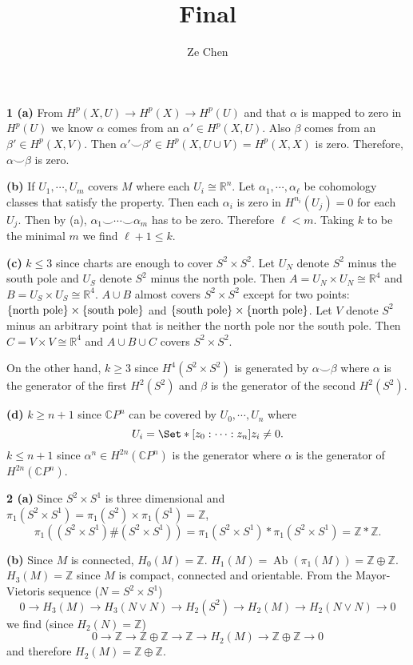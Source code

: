 \documentclass{article}
\title{Final}
\author{Ze Chen}
\makeatletter
\newcommand*{\shifttext}[1]{%
  \settowidth{\@tempdima}{#1}%
  \hspace{-\@tempdima}#1%
}
\newcommand{\plabel}[1]{%
\shifttext{\textbf{#1}\quad}%
}
\newcommand{\prule}{%
\begin{center}%
\hdashrule[0.5ex]{.99\linewidth}{1pt}{1pt 2.5pt}%
\end{center}%
}
\makeatother
\begin{document}
\maketitle

\plabel{1 (a)}%
From $H^p(X,U) \rightarrow H^p(X) \rightarrow H^p(U)$ and that $\alpha$ is mapped to zero in $H^p(U)$ we know $\alpha$ comes from an $\alpha'\in H^p(X,U)$.
Also $\beta$ comes from an $\beta'\in H^p(X,V)$.
Then $\alpha'\smile \beta'\in H^p(X,U\cup V) = H^p(X,X)$ is zero.
Therefore, $\alpha\smile \beta$ is zero.

\plabel{(b)}%
If $U_1,\cdots,U_m$ covers $M$ where each $U_i \cong \mathbb{R}^n$.
Let $\alpha_1,\cdots,\alpha_\ell$ be cohomology classes that satisfy the property.
Then each $\alpha_i$ is zero in $H^{n_i}(U_j)=0$ for each $U_j$.
Then by (a), $\alpha_1 \smile \cdots \smile \alpha_m$ has to be zero.
Therefore $\ell < m$. Taking $k$ to be the minimal $m$ we find $\ell+1\le k$.

\plabel{(c)}%
$k\le 3$ since charts are enough to cover $S^2\times S^2$.
Let $U_N$ denote $S^2$ minus the south pole and $U_S$ denote $S^2$ minus the north pole.
Then $A = U_N \times U_N \cong \mathbb{R}^4$ and $B = U_S\times U_S \cong \mathbb{R}^4$.
$A\cup B$ almost covers $S^2\times S^2$ except for two points: $\qty{\text{north pole}} \times \qty{\text{south pole}}$ and $\qty{\text{south pole}} \times \qty{\text{north pole}}$.
Let $V$ denote $S^2$ minus an arbitrary point that is neither the north pole nor the south pole.
Then $C = V\times V\cong \mathbb{R}^4$ and $A\cup B\cup C$ covers $S^2\times S^2$.
\par
On the other hand, $k\ge 3$ since $H^{4}(S^2\times S^2)$ is generated by $\alpha\smile \beta$ where $\alpha$ is the generator of the first $H^2(S^2)$ and $\beta$ is the generator of the second $H^2(S^2)$.

\plabel{(d)}%
$k\ge n+1$ since $\mathbb{C}P^n$ can be covered by $U_0,\cdots,U_n$ where
\[ U_i = \Set*{[z_0:\cdots:z_n]}{z_i\neq 0}. \]
$k\le n+1$ since $\alpha^n \in H^{2n}(\mathbb{C}P^n)$ is the generator where $\alpha$ is the generator of $H^{2n}(\mathbb{C}P^n)$.

\prule

\plabel{2 (a)}%
Since $S^2\times S^1$ is three dimensional and $\pi_1(S^2\times S^1) = \pi_1(S^2)\times \pi_1(S^1) = \mathbb{Z}$,
\[ \pi_1((S^2\times S^1)\# (S^2\times S^1)) = \pi_1(S^2\times S^1)*\pi_1(S^2\times S^1) = \mathbb{Z}*\mathbb{Z}. \]

\plabel{(b)}%
Since $M$ is connected, $H_0(M) = \mathbb{Z}$.
$H_1(M) = \operatorname{Ab}(\pi_1(M)) = \mathbb{Z}\oplus \mathbb{Z}$.
$H_3(M) = \mathbb{Z}$ since $M$ is compact, connected and orientable.
From the Mayor-Vietoris sequence ($N=S^2\times S^1$)
\[ 0 \rightarrow {H_3}(M) \rightarrow {H_3}(N\vee N) \rightarrow {H}_{2}(S^{2})\rightarrow {H}_{2}(M) \rightarrow {H}_{2}(N\vee N) \to 0 \]
we find (since $H_2(N) = \mathbb{Z}$)
\[ 0 \rightarrow \mathbb{Z} \rightarrow \mathbb{Z}\oplus\mathbb{Z} \rightarrow \mathbb{Z} \rightarrow {H}_{2}(M) \rightarrow \mathbb{Z}\oplus\mathbb{Z} \to 0 \]
and therefore $H_2(M) = \mathbb{Z}\oplus\mathbb{Z}$.
\end{document}
